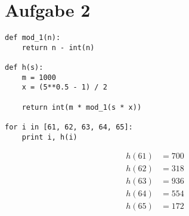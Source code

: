 \section*{Aufgabe 2}

\begin{minipage}{0.5\textwidth}
    \begin{verbatim}
def mod_1(n): 
	return n - int(n)

def h(s): 
	m = 1000
	x = (5**0.5 - 1) / 2

	return int(m * mod_1(s * x))

for i in [61, 62, 63, 64, 65]: 
	print i, h(i)
    \end{verbatim}
\end{minipage}
\begin{minipage}{0.5\textwidth}
	\begin{align*}
    	h(61) &= 700 \\
        h(62) &= 318 \\
        h(63) &= 936 \\
        h(64) &= 554 \\
        h(65) &= 172
    \end{align*}
\end{minipage}